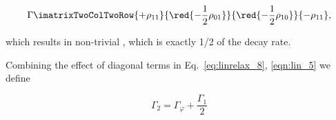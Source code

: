 \begin{framed}
\begin{itemize}
    \begin{equation}\label{eqn:lin_5}
      \Gamma\imatrixTwoColTwoRow{+\rho_{11}}{\red{-\frac{1}{2}\rho_{01}}}{\red{-\frac{1}{2}\rho_{10}}}{-\rho_{11}},
    \end{equation}

    \noindent   which  results   in   non-trivial  , which is exactly 1/2 of the decay rate.
  \end{itemize}

  Combining the effect of  diagonal terms in Eq.~\eqref{eq:linrelax_8},
  \eqref{eqn:lin_5} we define

  \begin{equation}\label{key}
    \Gamma_2 = \Gamma_{\varphi} + \frac{\Gamma_1}{2}
  \end{equation}
\end{framed}
\newpage

